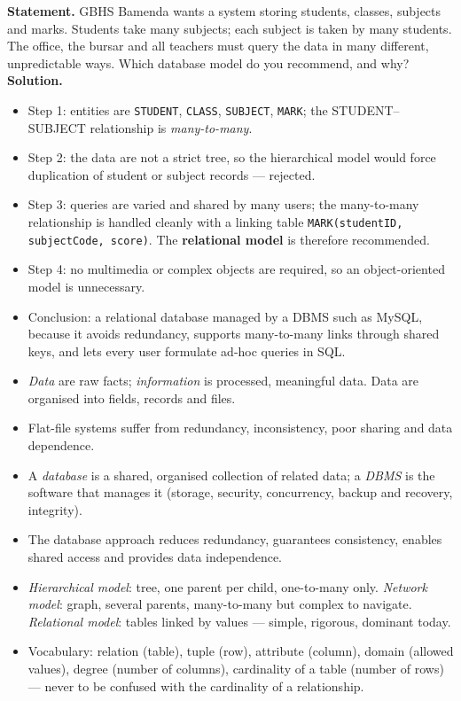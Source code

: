 \documentclass[11pt]{article}
\begin{document}
\begin{exoresolu}
\textbf{Statement.} GBHS Bamenda wants a system storing students, classes, subjects and marks. Students take many subjects; each subject is taken by many students. The office, the bursar and all teachers must query the data in many different, unpredictable ways. Which database model do you recommend, and why?
\tcblower
\textbf{Solution.}
\begin{itemize}
\item Step 1: entities are \texttt{STUDENT}, \texttt{CLASS}, \texttt{SUBJECT}, \texttt{MARK}; the STUDENT--SUBJECT relationship is \emph{many-to-many}.
\item Step 2: the data are not a strict tree, so the hierarchical model would force duplication of student or subject records — rejected.
\item Step 3: queries are varied and shared by many users; the many-to-many relationship is handled cleanly with a linking table \texttt{MARK(studentID, subjectCode, score)}. The \textbf{relational model} is therefore recommended.
\item Step 4: no multimedia or complex objects are required, so an object-oriented model is unnecessary.
\item Conclusion: a relational database managed by a DBMS such as MySQL, because it avoids redundancy, supports many-to-many links through shared keys, and lets every user formulate ad-hoc queries in SQL.
\end{itemize}
\end{exoresolu}

\begin{aretenir}
\begin{itemize}
\item \emph{Data} are raw facts; \emph{information} is processed, meaningful data. Data are organised into fields, records and files.
\item Flat-file systems suffer from redundancy, inconsistency, poor sharing and data dependence.
\item A \emph{database} is a shared, organised collection of related data; a \emph{DBMS} is the software that manages it (storage, security, concurrency, backup and recovery, integrity).
\item The database approach reduces redundancy, guarantees consistency, enables shared access and provides data independence.
\item \emph{Hierarchical model}: tree, one parent per child, one-to-many only. \emph{Network model}: graph, several parents, many-to-many but complex to navigate. \emph{Relational model}: tables linked by values — simple, rigorous, dominant today.
\item Vocabulary: relation (table), tuple (row), attribute (column), domain (allowed values), degree (number of columns), cardinality of a table (number of rows) — never to be confused with the cardinality of a relationship.
\end{itemize}
\end{aretenir}
\end{document}
